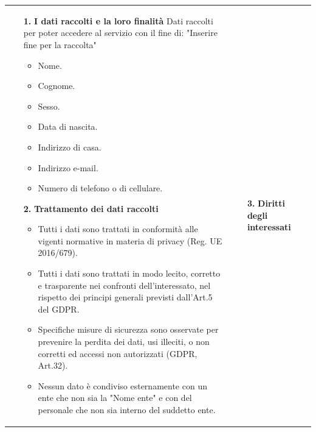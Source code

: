 \documentclass[hidelinks,12pt,a4paper]{article}
\begin{document}
\begin{roundCornerPage}[roundcorner=15pt]
\begin{minipage}[t][0.97\paperheight][t]{0.9\paperwidth}
				\begin{tabularx}{\linewidth}{XX}
					{ %
						\begin{enumerate}
							\item[\large{\textbf{1.}}] \large{\textbf{I dati raccolti e la loro finalità}}\medskip \newline
							\footnotesize
							Dati raccolti per poter accedere al servizio con il fine di: "Inserire fine per la raccolta"
							\begin{itemize}
								\item Nome.
								\item Cognome.
								\item Sesso.
								\item Data di nascita.
								\item Indirizzo di casa.
								\item Indirizzo e-mail.
								\item Numero di telefono o di cellulare.
							\end{itemize}
							\item[\large{\textbf{2.}}]  \large{\textbf{Trattamento dei dati raccolti}} \newline
							\footnotesize
							\vspace*{-5mm}
							\begin{itemize}
								\item Tutti i dati sono trattati in conformità alle vigenti normative in materia di privacy (Reg. UE 2016/679).
								\item Tutti i dati sono trattati in modo lecito, corretto e trasparente nei confronti dell'interessato, nel rispetto dei principi generali previsti dall'Art.5 del GDPR.
								\item Specifiche misure di sicurezza sono osservate per prevenire la perdita dei dati, usi illeciti, o non corretti ed accessi	non autorizzati (GDPR, Art.32).
								\item Nessun dato è condiviso esternamente con un ente che non sia la "Nome ente" e con del personale che non sia interno del suddetto ente.
							\end{itemize}
						\end{enumerate}
					}&{
						\begin{enumerate}
							\item[\large{\textbf{3.}}]  \large{\textbf{Diritti degli interessati}} \newline
							\footnotesize
							\vspace*{-5mm}

\end{enumerate}}
\end{tabularx}
\end{minipage}
\end{roundCornerPage}
\end{document}
